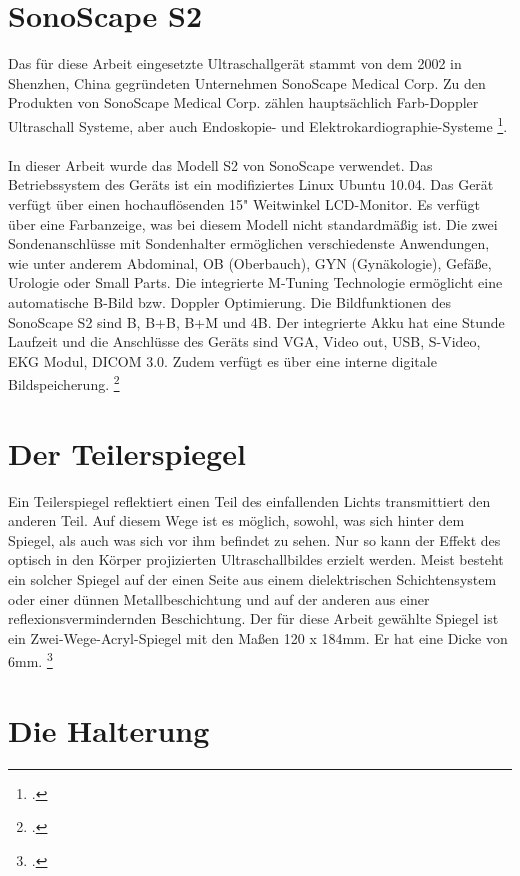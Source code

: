 \section{SonoScape S2}

Das für diese Arbeit eingesetzte Ultraschallgerät stammt von dem 2002 in Shenzhen, China gegründeten Unternehmen SonoScape Medical Corp. Zu den Produkten von SonoScape Medical Corp. zählen hauptsächlich Farb-Doppler Ultraschall Systeme, aber auch Endoskopie- und Elektrokardiographie-Systeme \footcite{SonoScape}.
\\
\\
In dieser Arbeit wurde das Modell S2 von SonoScape verwendet. Das Betriebssystem des Geräts ist ein modifiziertes Linux Ubuntu 10.04. Das Gerät verfügt über einen hochauflösenden 15" Weitwinkel LCD-Monitor. Es verfügt über eine Farbanzeige, was bei diesem Modell nicht standardmäßig ist. Die zwei Sondenanschlüsse mit Sondenhalter ermöglichen verschiedenste Anwendungen, wie unter anderem Abdominal, OB (Oberbauch), GYN (Gynäkologie), Gefäße, Urologie oder Small Parts. Die integrierte M-Tuning Technologie ermöglicht eine automatische B-Bild bzw. Doppler Optimierung. Die Bildfunktionen des SonoScape S2 sind B, B+B, B+M und 4B. Der integrierte Akku hat eine Stunde Laufzeit und die Anschlüsse des Geräts sind VGA, Video out, USB, S-Video, EKG Modul, DICOM 3.0. Zudem verfügt es über eine interne digitale Bildspeicherung. \footcite{SonoScapeS2}

\section{Der Teilerspiegel}

Ein Teilerspiegel reflektiert einen Teil des einfallenden Lichts transmittiert den anderen Teil. Auf diesem Wege ist es möglich, sowohl, was sich hinter dem Spiegel, als auch was sich vor ihm befindet zu sehen. Nur so kann der Effekt des optisch in den Körper projizierten Ultraschallbildes erzielt werden. Meist besteht ein solcher Spiegel auf der einen Seite aus einem dielektrischen Schichtensystem oder einer dünnen Metallbeschichtung und auf der anderen aus einer reflexionsvermindernden Beschichtung. Der für diese Arbeit gewählte Spiegel ist ein Zwei-Wege-Acryl-Spiegel mit den Maßen 120 x 184mm. Er hat eine Dicke von 6mm. \footcite{Teilerspiegel}

\section{Die Halterung}

